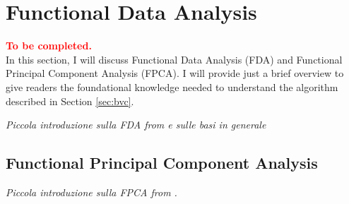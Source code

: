 \section{Functional Data Analysis}
\label{sec:fda}
\textbf{\textcolor{red}{To be completed.}}
\\
In this section, I will discuss Functional Data Analysis (FDA) and Functional Principal Component Analysis (FPCA). I will provide just a brief overview to give readers the foundational knowledge needed to understand the algorithm described in Section \ref{sec:bvc}. 

\textit{Piccola introduzione sulla FDA from \cite{ramsay_functional_2009} e sulle basi in generale}

\subsection{Functional Principal Component Analysis}
\textit{Piccola introduzione sulla FPCA from \cite{ramsay_functional_2009}.}


